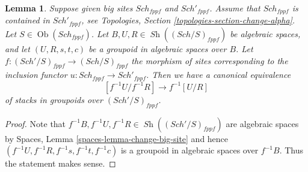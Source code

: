 \documentclass{stacks-project}
\theoremstyle{plain}
\newtheorem{lemma}[subsection]{Lemma}
\theoremstyle{definition}
\theoremstyle{remark}
\numberwithin{equation}{subsection}
\def\Sch{\mathit{Sch}}
\def\Ob{\mathop{\mathrm{Ob}}\nolimits}
\def\Sh{\mathop{\mathit{Sh}}\nolimits}
\begin{document}
\begin{lemma}
\label{lemma-quotient-stack-change-big-site}
Suppose given big sites $\Sch_{fppf}$ and $\Sch'_{fppf}$.
Assume that $\Sch_{fppf}$ is contained in $\Sch'_{fppf}$,
see Topologies, Section \ref{topologies-section-change-alpha}.
Let $S \in \Ob(\Sch_{fppf})$.
Let $B, U, R \in \Sh((\Sch/S)_{fppf})$ be algebraic spaces,
and let $(U, R, s, t, c)$ be a groupoid in algebraic spaces over $B$.
Let $f : (\Sch'/S)_{fppf} \to (\Sch/S)_{fppf}$ the morphism
of sites corresponding to the inclusion functor
$u : \Sch_{fppf} \to \Sch'_{fppf}$.
Then we have a canonical equivalence
$$
[f^{-1}U/f^{-1}R]
\longrightarrow
f^{-1}[U/R]
$$
of stacks in groupoids over $(\Sch'/S)_{fppf}$.
\end{lemma}

\begin{proof}
Note that $f^{-1}B, f^{-1}U, f^{-1}R \in \Sh((\Sch'/S)_{fppf})$
are algebraic spaces by
Spaces, Lemma \ref{spaces-lemma-change-big-site}
and hence $(f^{-1}U, f^{-1}R, f^{-1}s, f^{-1}t, f^{-1}c)$
is a groupoid in algebraic spaces over $f^{-1}B$. Thus the statement makes
sense.


\end{proof}
\end{document}
